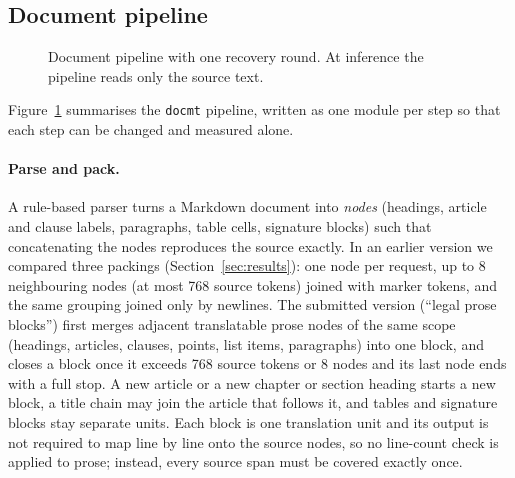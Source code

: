 \subsection{Document pipeline}
\begin{figure}[t]
\centering
{}
\caption{Document pipeline with one recovery round. At inference the pipeline reads only the source text.}
\label{fig:pipeline}
\end{figure}

Figure~\ref{fig:pipeline} summarises the \texttt{docmt} pipeline, written as one module per step so that each step can be changed and measured alone.

\paragraph{Parse and pack.}
A rule-based parser turns a Markdown document into \emph{nodes} (headings, article and clause labels, paragraphs, table cells, signature blocks) such that concatenating the nodes reproduces the source exactly.
In an earlier version we compared three packings (Section~\ref{sec:results}): one node per request, up to 8 neighbouring nodes (at most 768 source tokens) joined with marker tokens, and the same grouping joined only by newlines.
The submitted version (``legal prose blocks'') first merges adjacent translatable prose nodes of the same scope (headings, articles, clauses, points, list items, paragraphs) into one block, and closes a block once it exceeds 768 source tokens or 8 nodes and its last node ends with a full stop.
A new article or a new chapter or section heading starts a new block, a title chain may join the article that follows it, and tables and signature blocks stay separate units.
Each block is one translation unit and its output is not required to map line by line onto the source nodes, so no line-count check is applied to prose; instead, every source span must be covered exactly once.

